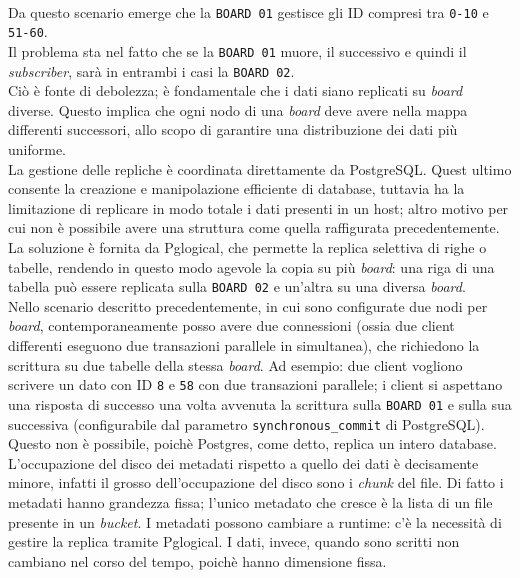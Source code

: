 \\
Da questo scenario emerge che la \verb"BOARD 01" gestisce gli ID compresi tra \verb"0-10" e \verb"51-60".\\
Il problema sta nel fatto che se la \verb"BOARD 01" muore, il successivo e quindi il \textit{subscriber}, sar\`{a} in entrambi i casi la \verb"BOARD 02".\\
Ci\`{o} \`{e} fonte di debolezza; \`{e} fondamentale che i dati siano replicati su \textit{board} diverse. Questo implica che ogni nodo di una \textit{board} deve avere nella mappa differenti successori, allo scopo di garantire una distribuzione dei dati pi\`{u} uniforme.\\
La gestione delle repliche \`{e} coordinata direttamente da PostgreSQL.
Quest ultimo consente la creazione e manipolazione efficiente di database, tuttavia ha la limitazione di replicare in modo totale i dati presenti in un host; altro motivo per cui non \`{e} possibile avere una struttura come quella raffigurata precedentemente.\\
La soluzione \`{e} fornita da Pglogical, che permette la replica selettiva di righe o tabelle, rendendo in questo modo agevole la copia su pi\`{u} \textit{board}: una riga di una tabella pu\`{o} essere replicata sulla \verb"BOARD 02" e un'altra su una diversa \textit{board}.\\
Nello scenario descritto precedentemente, in cui sono configurate due nodi per \textit{board}, contemporaneamente posso avere due connessioni (ossia due client differenti eseguono due transazioni parallele in simultanea), che richiedono la scrittura su due tabelle della stessa \textit{board}. Ad esempio: due client vogliono scrivere un dato con ID \verb"8" e \verb"58" con due transazioni parallele; i client si aspettano una risposta di successo una volta avvenuta la scrittura sulla \verb"BOARD 01" e sulla sua successiva (configurabile dal parametro \verb"synchronous_commit" di PostgreSQL). Questo non \`{e} possibile, poich\`{e} Postgres, come detto, replica un intero database.
L'occupazione del disco dei metadati rispetto a quello dei dati \`{e} decisamente minore, infatti il grosso dell'occupazione del disco sono i \textit{chunk} del file. Di fatto i metadati hanno grandezza fissa; l'unico metadato che cresce \`{e} la lista di un file presente in un \textit{bucket}. I metadati possono cambiare a runtime: c'\`{e} la necessit\`{a} di gestire la replica tramite Pglogical.
I dati, invece, quando sono scritti non cambiano nel corso del tempo, poich\`{e} hanno dimensione fissa. \\
